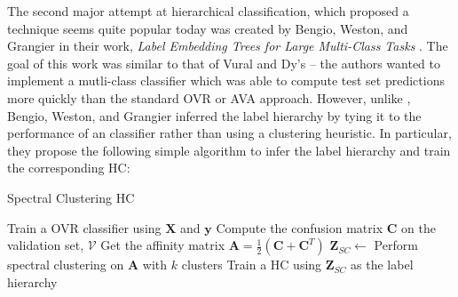 \documentclass[../thesis.tex]{subfiles}
\begin{document}
The second major attempt at hierarchical classification, which proposed a
technique seems quite popular today was created by Bengio, Weston, and Grangier
in their work, \textit{Label Embedding Trees for Large Multi-Class Tasks}
\cite{bengio2010label}. The goal of this work was similar to that of Vural and
Dy's -- the authors wanted to implement a mutli-class classifier which was able
to compute test set predictions more quickly than the standard OVR or AVA
approach. However, unlike \cite{vural2004hierarchical}, Bengio, Weston, and
Grangier inferred the label hierarchy by tying it to the performance of an
classifier rather than using a clustering heuristic. In particular, they propose
the following simple algorithm to infer the label hierarchy and train the
corresponding HC:
\begin{algorithm}[H]
    \caption{Spectral Clustering HC}
    \label{alg:bengio_approach}
    \begin{algorithmic}[1]
            \State Train a OVR classifier using $\mathbf{X}$ and $\mathbf{y}$
            \State Compute the confusion matrix $\mathbf{C}$ on the validation
            set, $\mathcal{V}$
            \State Get the affinity matrix $\mathbf{A} =
            \frac{1}{2}\left(\mathbf{C} + \mathbf{C}^T\right)$
            \State $\mathbf{Z}_{SC} \gets $ Perform spectral clustering on
            $\mathbf{A}$ with $k$ clusters
            \State Train a HC using $\mathbf{Z}_{SC}$ as the label hierarchy
        \EndProcedure
    \end{algorithmic}
\end{algorithm}
\end{document}
